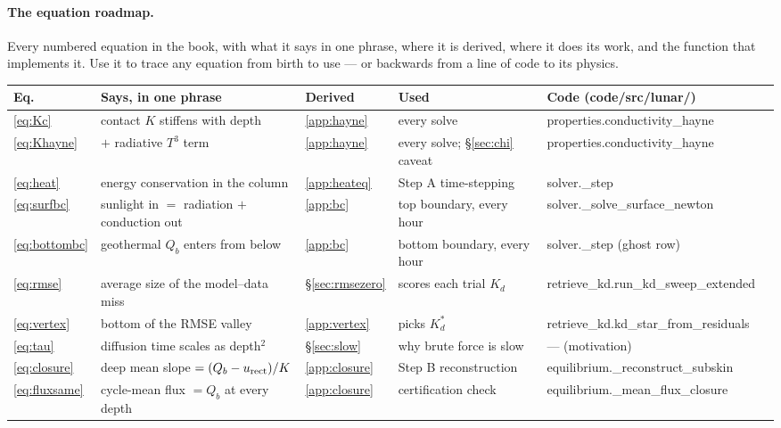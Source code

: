 \documentclass[11pt]{report}
\newcommand{\code}[1]{{\ttfamily\small #1}}
\begin{document}
\paragraph{\textbf{The equation roadmap.}} Every numbered equation in the book,
with what it says in one phrase, where it is derived, where it does its work,
and the function that implements it. Use it to trace any equation from birth to
use --- or backwards from a line of code to its physics.

\begin{center}\footnotesize
\begin{tabular}{@{}llllll@{}}
\toprule
Eq. & Says, in one phrase & Derived & Used & Code (\code{code/src/lunar/}) \\
\midrule
\eqref{eq:Kc} & contact $K$ stiffens with depth & \ref{app:hayne} & every solve & \code{properties.conductivity\_hayne} \\
\eqref{eq:Khayne} & $+$ radiative $T^3$ term & \ref{app:hayne} & every solve; \S\ref{sec:chi} caveat & \code{properties.conductivity\_hayne} \\
\eqref{eq:heat} & energy conservation in the column & \ref{app:heateq} & Step A time-stepping & \code{solver.\_step} \\
\eqref{eq:surfbc} & sunlight in $=$ radiation $+$ conduction out & \ref{app:bc} & top boundary, every hour & \code{solver.\_solve\_surface\_newton} \\
\eqref{eq:bottombc} & geothermal $Q_b$ enters from below & \ref{app:bc} & bottom boundary, every hour & \code{solver.\_step} (ghost row) \\
\eqref{eq:rmse} & average size of the model--data miss & \S\ref{sec:rmsezero} & scores each trial $K_d$ & \code{retrieve\_kd.run\_kd\_sweep\_extended} \\
\eqref{eq:vertex} & bottom of the RMSE valley & \ref{app:vertex} & picks $K_d^{*}$ & \code{retrieve\_kd.kd\_star\_from\_residuals} \\
\eqref{eq:tau} & diffusion time scales as depth$^2$ & \S\ref{sec:slow} & why brute force is slow & --- (motivation) \\
\eqref{eq:closure} & deep mean slope $=(Q_b-u_{\rm rect})/K$ & \ref{app:closure} & Step B reconstruction & \code{equilibrium.\_reconstruct\_subskin} \\
\eqref{eq:fluxsame} & cycle-mean flux $=Q_b$ at every depth & \ref{app:closure} & certification check & \code{equilibrium.\_mean\_flux\_closure} \\
\bottomrule
\end{tabular}
\end{center}
\end{document}
